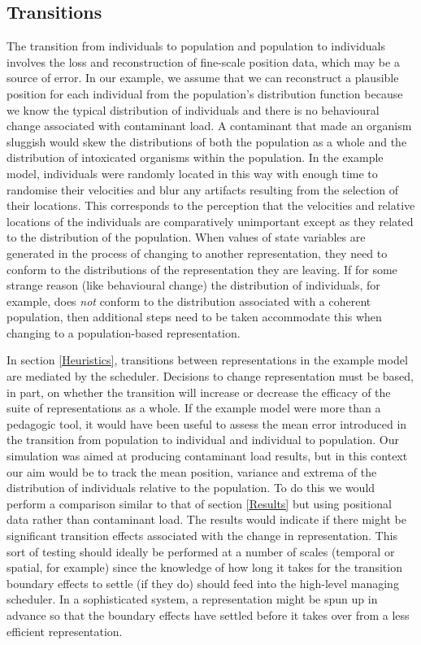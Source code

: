 \subsection{Transitions}

The transition from individuals to population and population to individuals
involves the loss and reconstruction of fine-scale position data, which may be
a source of error. In our example, we assume that we can reconstruct a
plausible position for each individual from the population's distribution
function because we know the typical distribution of individuals and there is
no behavioural change associated with contaminant load. A contaminant that
made an organism sluggish would skew the distributions of both the population
as a whole and the distribution of intoxicated organisms within the
population. In the example model, individuals were randomly located in this
way with enough time to randomise their velocities and blur any artifacts
resulting from the selection of their locations. This corresponds to the
perception that the velocities and relative locations of the individuals are
comparatively unimportant except as they related to the distribution of the
population. When values of state variables are generated in the process of
changing to another representation, they need to conform to the distributions
of the representation they are leaving. If for some strange reason (like
behavioural change) the distribution of individuals, for example, does
{\em{not}\/} conform to the distribution associated with a coherent
population, then additional steps need to be taken accommodate this when
changing to a population-based representation.

In section \ref{Heuristics}, transitions between representations in the
example model are mediated by the scheduler. Decisions to change
representation must be based, in part, on whether the transition will increase
or decrease the efficacy of the suite of representations as a whole. If the
example model were more than a pedagogic tool, it would have been useful to
assess the mean error introduced in the transition from population to
individual and individual to population. Our simulation was aimed at producing
contaminant load results, but in this context our aim would be to track the
mean position, variance and extrema of the distribution of individuals
relative to the population. To do this we would perform a comparison similar
to that of section \ref{Results} but using positional data rather than
contaminant load. The results would indicate if there might be significant
transition effects associated with the change in representation. This sort of
testing should ideally be performed at a number of scales (temporal or
spatial, for example) since the knowledge of how long it takes for the
transition boundary effects to settle (if they do) should feed into the
high-level managing scheduler. In a sophisticated system, a representation
might be spun up in advance so that the boundary effects have settled before
it takes over from a less efficient representation.

